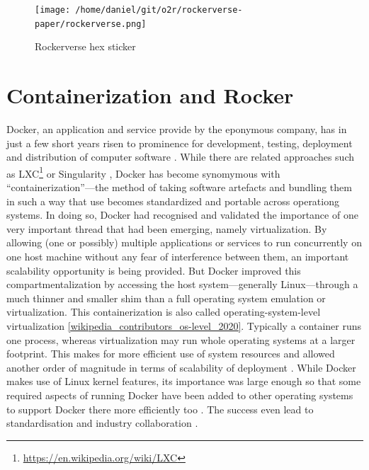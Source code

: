 \begin{figure}
\centering
\texttt{[image: /home/daniel/git/o2r/rockerverse-paper/rockerverse.png]}
\caption{Rockerverse hex sticker}
\end{figure}

\hypertarget{containerization-and-rocker}{%
\section{Containerization and
Rocker}\label{containerization-and-rocker}}

\label{containerisation} \label{rocker}

Docker, an application and service provide by the eponymous company, has
in just a few short years risen to prominence for development, testing,
deployment and distribution of computer software
\citep[cf.][]{datadog_8_2018,munoz_history_2019}. While there are
related approaches such as
LXC\footnote{\href{https://en.wikipedia.org/wiki/LXC}{https://en.wikipedia.org/wiki/LXC}}
or Singularity \citep{kurtzer_singularity_2017}, Docker has become
synomymous with ``containerization''---the method of taking software
artefacts and bundling them in such a way that use becomes standardized
and portable across operationg systems. In doing so, Docker had
recognised and validated the importance of one very important thread
that had been emerging, namely virtualization. By allowing (one or
possibly) multiple applications or services to run concurrently on one
host machine without any fear of interference between them, an important
scalability opportunity is being provided. But Docker improved this
compartmentalization by accessing the host system---generally
Linux---through a much thinner and smaller shim than a full operating
system emulation or virtualization. This containerization is also called
operating-system-level virtualization
\ref{wikipedia_contributors_os-level_2020}. Typically a container runs
one process, whereas virtualization may run whole operating systems at a
larger footprint. This makes for more efficient use of system resources
\citep{felter_updated_2015} and allowed another order of magnitude in
terms of scalability of deployment \citep[cf.][]{datadog_8_2018}. While
Docker makes use of Linux kernel features, its importance was large
enough so that some required aspects of running Docker have been added
to other operating systems to support Docker there more efficiently too
\citep{microsoft_linux_2019}. The success even lead to standardisation
and industry collaboration \citep{oci_open_2019}.

